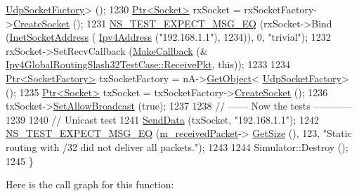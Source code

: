 \begin{DoxyCode}
      \hyperlink{classns3_1_1UdpSocketFactory}{UdpSocketFactory}> ();
1230   \hyperlink{classns3_1_1Ptr}{Ptr<Socket>} rxSocket = rxSocketFactory->\hyperlink{classns3_1_1SocketFactory_a97351e6e7860503a4912042530449f62}{CreateSocket} ();
1231   \hyperlink{group__testing_ga7304ba46a28d8cf08dfdfd6499cf7068}{NS\_TEST\_EXPECT\_MSG\_EQ} (rxSocket->Bind (\hyperlink{classns3_1_1InetSocketAddress}{InetSocketAddress} (
      \hyperlink{classns3_1_1Ipv4Address}{Ipv4Address} (\textcolor{stringliteral}{"192.168.1.1"}), 1234)), 0, \textcolor{stringliteral}{"trivial"});
1232   rxSocket->SetRecvCallback (\hyperlink{group__makecallbackmemptr_ga9376283685aa99d204048d6a4b7610a4}{MakeCallback} (&
      \hyperlink{classIpv4GlobalRoutingSlash32TestCase_a06786cf1bd29354451ca3303c1b3f2d7}{Ipv4GlobalRoutingSlash32TestCase::ReceivePkt}, \textcolor{keyword}{this}));
1233 
1234   \hyperlink{classns3_1_1Ptr}{Ptr<SocketFactory>} txSocketFactory = nA->\hyperlink{classns3_1_1Object_a13e18c00017096c8381eb651d5bd0783}{GetObject}<
      \hyperlink{classns3_1_1UdpSocketFactory}{UdpSocketFactory}> ();
1235   \hyperlink{classns3_1_1Ptr}{Ptr<Socket>} txSocket = txSocketFactory->\hyperlink{classns3_1_1SocketFactory_a97351e6e7860503a4912042530449f62}{CreateSocket} ();
1236   txSocket->\hyperlink{classns3_1_1Socket_a32b4fa27b732a63207c8d9054a817ed5}{SetAllowBroadcast} (\textcolor{keyword}{true});
1237 
1238   \textcolor{comment}{// ------ Now the tests ------------}
1239 
1240   \textcolor{comment}{// Unicast test}
1241   \hyperlink{classIpv4GlobalRoutingSlash32TestCase_a4d39b47fdcbf5ec410a8e2810fdea618}{SendData} (txSocket, \textcolor{stringliteral}{"192.168.1.1"});
1242   \hyperlink{group__testing_ga7304ba46a28d8cf08dfdfd6499cf7068}{NS\_TEST\_EXPECT\_MSG\_EQ} (\hyperlink{classIpv4GlobalRoutingSlash32TestCase_ae7e73a96ac4929007add694e0c1fba8b}{m\_receivedPacket}->
      \hyperlink{classns3_1_1Packet_a462855c9929954d4301a4edfe55f4f1c}{GetSize} (), 123, \textcolor{stringliteral}{"Static routing with /32 did not deliver all packets."});
1243 
1244   Simulator::Destroy ();
1245 \}
\end{DoxyCode}


Here is the call graph for this function\+:


